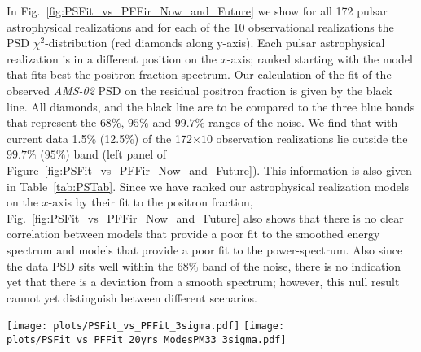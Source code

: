 \documentclass[aps,prd,twocolumn,amsmath,superscriptaddress,amssymb,showpacs,floatfix,nofootinbib]{revtex4-1}
\begin{document}
In Fig.~\ref{fig:PSFit_vs_PFFir_Now_and_Future} we show for all
172 pulsar astrophysical realizations and for each of the 10
observational realizations the PSD $\chi^{2}$-distribution (red
diamonds along y-axis).  Each pulsar astrophysical realization
is in a different position on the $x$-axis; ranked starting with the
model that fits best the positron fraction spectrum. 
Our calculation of the fit of the observed
\textit{AMS-02} PSD on the residual positron fraction is given
by the black line. All diamonds, and the black line
are to be compared to the three blue bands that represent the
$68\%$, $95\%$ and $99.7\%$ ranges of the noise.  We find
that with current data 1.5$\%$ (12.5$\%$) of the 172$\times 10$
observation realizations lie outside the $99.7 \%$ ($95 \%$) band
(left panel of  Figure~\ref{fig:PSFit_vs_PFFir_Now_and_Future}).
This information is also given in Table~\ref{tab:PSTab}.  
Since we have ranked our astrophysical realization models on the 
$x$-axis by their fit to
the positron fraction, Fig.~\ref{fig:PSFit_vs_PFFir_Now_and_Future} 
also shows that there is no clear correlation between models
that provide a poor fit to the smoothed energy spectrum and
models that provide a poor fit to the power-spectrum.  Also
since the data PSD sits well within the 68$\%$ band of the
noise, there is no  indication yet that there is a deviation
from a smooth spectrum;  however, this null
result cannot yet distinguish between different scenarios.
\begin{figure*}
\begin{centering}
\texttt{[image: plots/PSFit\_vs\_PFFit\_3sigma.pdf]}
\hspace{0.0cm}
\texttt{[image: plots/PSFit\_vs\_PFFit\_20yrs\_ModesPM33\_3sigma.pdf]}
\end{centering}
\vspace{-0.2cm}
\caption{The scatter of 10 observational realizations in the PSD $\chi^{2}$/dof for each of the 172 
pulsar astrophysical realizations (red diamonds). The blue bands 
include the noise ranges for the PSD $\chi^{2}$. \textit{Left}: Current, with the black line giving the  PSD of the measurement, showing no evidence for features. \textit{Right}: After 20 years of data, $\sim10 \%$ of the 
pulsar realizations will provide (at 2$\sigma$) detectable fluctuations.}
\vspace{-0.3cm}
\label{fig:PSFit_vs_PFFir_Now_and_Future}
\end{figure*}
\end{document}
